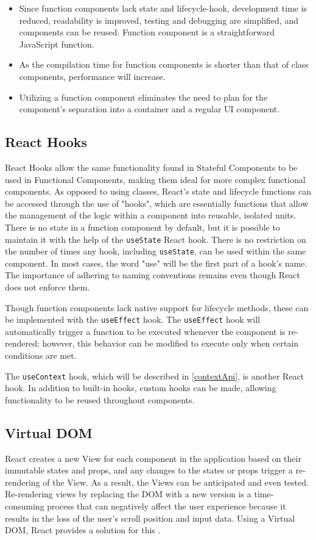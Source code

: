\begin{itemize}
  \item Since function components lack state and lifecycle-hook, development time is reduced, readability is improved, testing and debugging are simplified, and components can be reused. Function component is a straightforward JavaScript function.
  \item As the compilation time for function components is shorter than that of class components, performance will increase.
  \item Utilizing a function component eliminates the need to plan for the component's separation into a container and a regular UI component.
\end{itemize}

\subsection{React Hooks}
\label{react_hooks}
React Hooks allow the same functionality found in Stateful Components to be used in Functional Components, making them ideal for more complex functional components. As opposed to using classes, React's state and lifecycle functions can be accessed through the use of "hooks", which are essentially functions that allow the management of the logic within a component into reusable, isolated units. There is no state in a function component by default, but it is possible to maintain it with the help of the \texttt{useState} React hook. There is no restriction on the number of times any hook, including \texttt{useState}, can be used within the same component. In most cases, the word "use" will be the first part of a hook's name. The importance of adhering to naming conventions remains even though React does not enforce them.

Though function components lack native support for lifecycle methods, these can be implemented with the \texttt{useEffect} hook. The \texttt{useEffect} hook will automatically trigger a function to be executed whenever the component is re-rendered; however, this behavior can be modified to execute only when certain conditions are met.

The \texttt{useContext} hook, which will be described in \autoref{contextApi}, is another React hook. In addition to built-in hooks, custom hooks can be made, allowing functionality to be reused throughout components.

\subsection{Virtual DOM}
React creates a new View for each component in the application based on their immutable states and props, and any changes to the states or props trigger a re-rendering of the View. As a result, the Views can be anticipated and even tested. Re-rendering views by replacing the DOM with a new version is a time-consuming process that can negatively affect the user experience because it results in the loss of the user's scroll position and input data. Using a Virtual DOM, React provides a solution for this \autocite{david2020building}.

